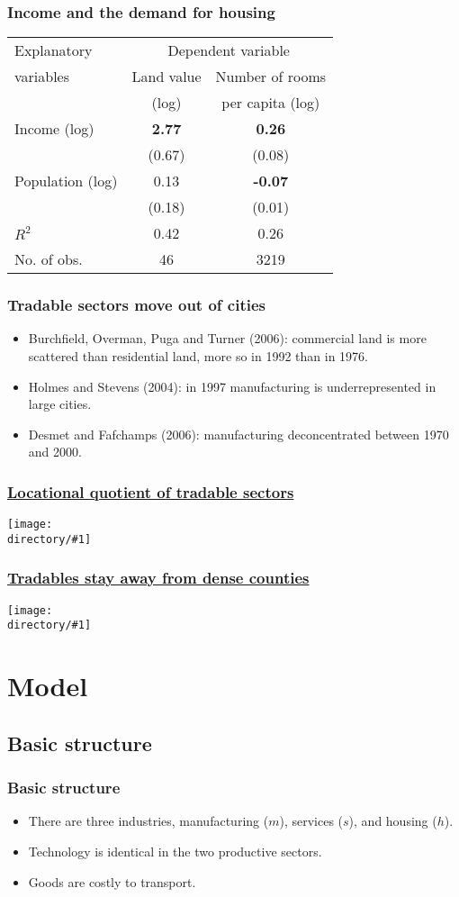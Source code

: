\documentclass[handout,compress,mathserif]{beamer}
\newcommand{\directory}{figures}
\newcommand{\widefigure}[2]{\begin{frame}\frametitle{\hyperlink{#1back}{#2}}\hypertarget{#1}{{\begin{center}\texttt{[image: \\directory/\#1]}\end{center}}}\end{frame}}
\begin{document}
\begin{frame}\frametitle{Income and the demand for housing}
\begin{table}[h!]
\center 
\begin{tabular}{l|cc}
  \hline\hline
  Explanatory & \multicolumn{2}{c}{Dependent variable} \\
  variables & Land value & Number of rooms \\ 
            & (log)      & per capita (log) \\
  \hline
  Income (log)   & \textbf{2.77}   & \textbf{0.26}\\
                 & (0.67)          & (0.08)\\
  Population (log)    & 0.13            &  \textbf{-0.07}\\
                 & (0.18)          & (0.01) \\ \hline
  $R^2$          & 0.42            & 0.26\\
  No. of obs.    & 46              & 3219\\ \hline\hline
\end{tabular}
\end{table}
\end{frame}

\begin{frame}\frametitle{Tradable sectors move out of cities}
\begin{itemize}
    \item Burchfield, Overman, Puga and Turner (2006): commercial land is more scattered than residential land, more so in 1992 than in 1976.
    \item Holmes and Stevens (2004): in 1997 manufacturing is underrepresented in large cities.
    \item Desmet and Fafchamps (2006): manufacturing deconcentrated between 1970 and 2000.
\end{itemize}
\end{frame}

\widefigure{LQ_map}{Locational quotient of tradable sectors}
\widefigure{LQ_scatter}{Tradables stay away from dense counties}

\section{Model}
\subsection{Basic structure}
\begin{frame}\frametitle{Basic structure}
\begin{itemize}
    \item There are three industries, manufacturing ($m$), services ($s$), and housing ($h$).
    \item Technology is identical in the two productive sectors.
    \item Goods are costly to transport.
\end{itemize}
\end{frame}
\end{document}
